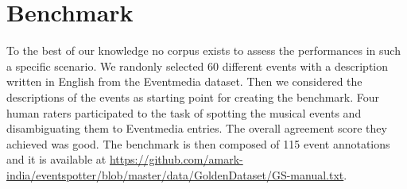 \documentclass[10pt,a4paper]{article}
\begin{document}
\section{Benchmark}
To the best of our knowledge no corpus exists to assess the performances in such a specific scenario. We randonly selected 60 different events with a description written in English from the Eventmedia dataset. Then we considered the descriptions of the events as starting point for creating the benchmark. Four human raters participated to the task of spotting the musical events and disambiguating them to Eventmedia entries. The overall agreement score they achieved was good. The benchmark is then composed of 115 event annotations and it is available at \url{https://github.com/amark-india/eventspotter/blob/master/data/GoldenDataset/GS-manual.txt}.

\end{document}
